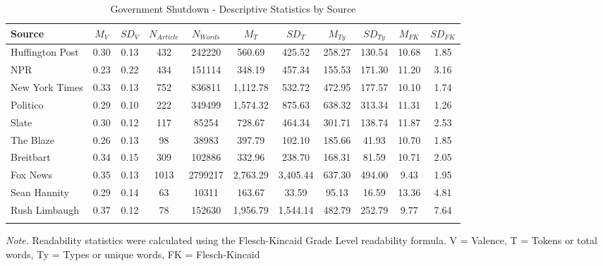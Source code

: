 \documentclass[
  english,
  man]{apa6}
\begin{document}
\begin{table}[tbp]

\begin{center}
\begin{threeparttable}

\caption{\label{tab:exp2-source-descriptives-gs}Government Shutdown - Descriptive Statistics by Source}

\footnotesize{

\begin{tabular}{lcccccccccc}
\toprule
Source & $M_V$ & $SD_V$ & $N_{Article}$ & $N_{Words}$ & $M_T$ & $SD_T$ & $M_{Ty}$ & $SD_{Ty}$ & $M_{FK}$ & $SD_{FK}$\\
\midrule
Huffington Post & 0.30 & 0.13 & 432 & 242220 & 560.69 & 425.52 & 258.27 & 130.54 & 10.68 & 1.85\\
NPR & 0.23 & 0.22 & 434 & 151114 & 348.19 & 457.34 & 155.53 & 171.30 & 11.20 & 3.16\\
New York Times & 0.33 & 0.13 & 752 & 836811 & 1,112.78 & 532.72 & 472.95 & 177.57 & 10.10 & 1.74\\
Politico & 0.29 & 0.10 & 222 & 349499 & 1,574.32 & 875.63 & 638.32 & 313.34 & 11.31 & 1.26\\
Slate & 0.30 & 0.12 & 117 & 85254 & 728.67 & 464.34 & 301.71 & 138.74 & 11.87 & 2.53\\
The Blaze & 0.26 & 0.13 & 98 & 38983 & 397.79 & 102.10 & 185.66 & 41.93 & 10.70 & 1.85\\
Breitbart & 0.34 & 0.15 & 309 & 102886 & 332.96 & 238.70 & 168.31 & 81.59 & 10.71 & 2.05\\
Fox News & 0.35 & 0.13 & 1013 & 2799217 & 2,763.29 & 3,405.44 & 637.30 & 494.00 & 9.43 & 1.95\\
Sean Hannity & 0.29 & 0.14 & 63 & 10311 & 163.67 & 33.59 & 95.13 & 16.59 & 13.36 & 4.81\\
Rush Limbaugh & 0.37 & 0.12 & 78 & 152630 & 1,956.79 & 1,544.14 & 482.79 & 252.79 & 9.77 & 7.64\\
\bottomrule
\addlinespace
\end{tabular}

}

\begin{tablenotes}[para]
\normalsize{\textit{Note.} Readability statistics were calculated using the Flesch-Kincaid Grade Level readability formula. V = Valence, T = Tokens or total words, Ty = Types or unique words, FK = Flesch-Kincaid}
\end{tablenotes}

\end{threeparttable}
\end{center}

\end{table}
\end{document}

